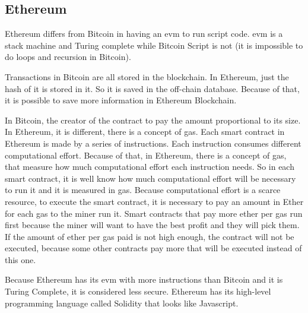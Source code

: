 \subsection{Ethereum}

Ethereum differs from Bitcoin in having an \gls{evm} to run script code.
\gls{evm} is a stack machine and Turing complete while Bitcoin Script is not
(it is impossible to do loops and recursion in Bitcoin).

Transactions in Bitcoin are all stored in the blockchain.
In Ethereum, just the hash of it is stored in it.
So it is saved in the off-chain database.
Because of that, it is possible to save more information in Ethereum Blockchain.

In Bitcoin, the creator of the contract to pay the amount proportional to its size.
In Ethereum, it is different, there is a concept of gas.
Each smart contract in Ethereum is made by a series of instructions.
Each instruction consumes different computational effort.
Because of that, in Ethereum, there is a concept of gas, that measure how much computational effort
each instruction needs.
So in each smart contract, it is well know how much computational effort will be necessary to run it
and it is measured in gas.
Because computational effort is a scarce resource, to execute the smart contract, it is necessary to
pay an amount in Ether for each gas to the miner run it.
Smart contracts that pay more ether per gas run first because the miner will want to have the best
profit and they will pick them.
If the amount of ether per gas paid is not high enough, the contract will not be executed,
because some other contracts pay more that will be executed instead of this one.

Because Ethereum has its \gls{evm} with more instructions than Bitcoin and it is Turing Complete,
it is considered less secure.
Ethereum has its high-level programming language called Solidity that looks like Javascript.
